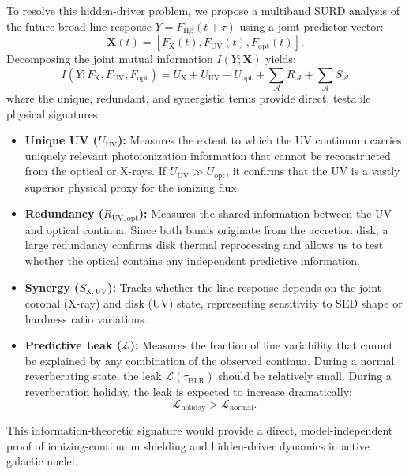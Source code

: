 \documentclass[12pt, a4paper]{article}
\begin{document}
To resolve this hidden-driver problem, we propose a multiband SURD analysis of the future broad-line response $Y = F_{\mathrm{H}\beta}(t+\tau)$ using a joint predictor vector:
\begin{equation}
\mathbf{X}(t) = \left[ F_{\mathrm{X}}(t), F_{\mathrm{UV}}(t), F_{\mathrm{opt}}(t) \right].
\label{eq:multiband_predictors}
\end{equation}
Decomposing the joint mutual information $I(Y; \mathbf{X})$ yields:
\begin{equation}
I(Y; F_{\mathrm{X}}, F_{\mathrm{UV}}, F_{\mathrm{opt}}) = U_{\mathrm{X}} + U_{\mathrm{UV}} + U_{\mathrm{opt}} + \sum_{\mathcal{A}} R_{\mathcal{A}} + \sum_{\mathcal{A}} S_{\mathcal{A}}
\label{eq:multiband_surd}
\end{equation}
where the unique, redundant, and synergistic terms provide direct, testable physical signatures:
\begin{itemize}
    \item \textbf{Unique UV ($U_{\mathrm{UV}}$):} Measures the extent to which the UV continuum carries uniquely relevant photoionization information that cannot be reconstructed from the optical or X-rays. If $U_{\mathrm{UV}} \gg U_{\mathrm{opt}}$, it confirms that the UV is a vastly superior physical proxy for the ionizing flux.
    \item \textbf{Redundancy ($R_{\mathrm{UV,opt}}$):} Measures the shared information between the UV and optical continua. Since both bands originate from the accretion disk, a large redundancy confirms disk thermal reprocessing and allows us to test whether the optical contains any independent predictive information.
    \item \textbf{Synergy ($S_{\mathrm{X,UV}}$):} Tracks whether the line response depends on the joint coronal (X-ray) and disk (UV) state, representing sensitivity to SED shape or hardness ratio variations.
    \item \textbf{Predictive Leak ($\mathcal{L}$):} Measures the fraction of line variability that cannot be explained by any combination of the observed continua. During a normal reverberating state, the leak $\mathcal{L}(\tau_{\mathrm{BLR}})$ should be relatively small. During a reverberation holiday, the leak is expected to increase dramatically:
    \begin{equation}
    \mathcal{L}_{\mathrm{holiday}} > \mathcal{L}_{\mathrm{normal}}.
    \label{eq:leak_holiday}
    \end{equation}
\end{itemize}
This information-theoretic signature would provide a direct, model-independent proof of ionizing-continuum shielding and hidden-driver dynamics in active galactic nuclei.
\end{document}
